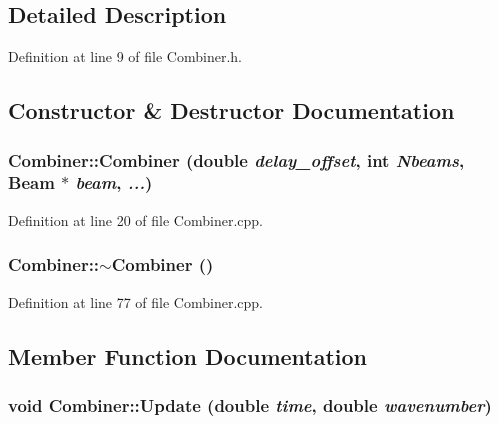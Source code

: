\subsection{Detailed Description}


Definition at line 9 of file Combiner.h.



\subsection{Constructor \& Destructor Documentation}
\hypertarget{classCombiner_acb929ab3e336121021ae790108280f8d}{
\subsubsection[{Combiner}]{\setlength{\rightskip}{0pt plus 5cm}Combiner::Combiner (double {\em delay\_\-offset}, \/  int {\em Nbeams}, \/  {\bf Beam} $\ast$ {\em beam}, \/   {\em ...})}}
\label{classCombiner_acb929ab3e336121021ae790108280f8d}


Definition at line 20 of file Combiner.cpp.

\hypertarget{classCombiner_a9df9f0ea0076115ceb11eea79b3d0b55}{
\subsubsection[{$\sim$Combiner}]{\setlength{\rightskip}{0pt plus 5cm}Combiner::$\sim$Combiner ()}}
\label{classCombiner_a9df9f0ea0076115ceb11eea79b3d0b55}


Definition at line 77 of file Combiner.cpp.



\subsection{Member Function Documentation}
\hypertarget{classCombiner_ac2f8f2ab1dba11aa15c29776d78229a5}{
\subsubsection[{Update}]{\setlength{\rightskip}{0pt plus 5cm}void Combiner::Update (double {\em time}, \/  double {\em wavenumber})}}
\label{classCombiner_ac2f8f2ab1dba11aa15c29776d78229a5}


